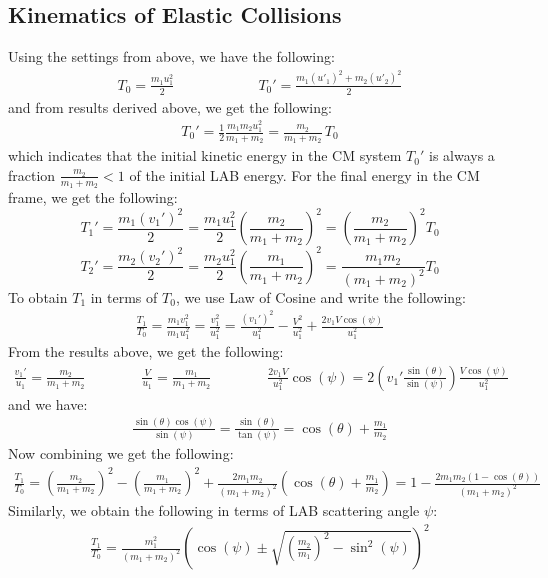 \documentclass[11pt,oneside]{book}
\theoremstyle{break}
\theoremstyle{break}
\begin{document}
\subsection*{Kinematics of Elastic Collisions}
Using the settings from above, we have the following:
\begin{align*}
T_0 = \frac{m_1 u_1^2}{2} \qquad \qquad \qquad T_{0}' = \frac{m_1 (u'_1)^2 + m_2 (u'_2)^2}{2}
\end{align*}
and from results derived above, we get the following:
\begin{align*}
T_0' = \frac{1}{2}\frac{m_1m_2u_1^2}{m_1 + m_2}  = \frac{m_2 }{m_1 + m_2} \, T_0
\end{align*}
which indicates that the initial kinetic energy in the CM system $T_0'$ is always a fraction $\frac{m_2}{m_1+m_2}<1$ of the initial LAB energy. For the final energy in the CM frame, we get the following:
$$
T_1' = \frac{m_1(v_1')^2}{2} = \frac{m_1u_1^2}{2}\left( \frac{m_2}{m_1+m_2}\right)^2  = \left( \frac{m_2}{m_1+m_2}\right)^2 T_0 
$$
$$
T_2' = \frac{m_2(v_2')^2}{2} = \frac{m_2u_1^2}{2}\left( \frac{m_1}{m_1 + m_2}\right)^2 = \frac{m_1m_2}{(m_1 + m_2)^2}T_0
$$
To obtain $T_1$ in terms of $T_0$, we use Law of Cosine and write the following:
\begin{align*}
\frac{T_1}{T_0} = \frac{m_1 v_1^2}{m_1 u_1^2} = \frac{v_1^2}{u_1^2} = \frac{(v_1')^2}{u_1^2}- \frac{V^2}{u_1^2} + \frac{2v_1V\cos(\psi)}{u_1^2}
\end{align*}
From the results above, we get the following:
\begin{align*}
\frac{v_1'}{u_1} = \frac{m_2}{m_1 + m_2} \qquad\qquad \frac{V}{u_1} = \frac{m_1}{m_1 + m_2} \qquad\qquad \frac{2v_1 V}{u_1^2}\cos(\psi) = 2\left( v_1' \frac{\sin(\theta)}{\sin(\psi)}\right) \frac{V \cos(\psi)}{u_1^2}
\end{align*} 
and we have:
\begin{align*}
\frac{\sin(\theta)\cos(\psi)}{\sin(\psi)} = \frac{\sin(\theta)}{\tan(\psi)} = \cos(\theta) + \frac{m_1}{m_2}
\end{align*}
Now combining we get the following:
\begin{align*}
\frac{T_1}{T_0} = \left(\frac{m_2}{m_1 + m_2} \right)^2 - \left( \frac{m_1}{m_1+m_2}\right)^2 + \frac{2m_1m_2}{(m_1+m_2)^2}\left( \cos(\theta) + \frac{m_1}{m_2}\right) = 1-\frac{2m_1m_2(1-\cos(\theta))}{(m_1+m_2)^2}
\end{align*}
Similarly, we obtain the following in terms of LAB scattering angle $\psi$:
\begin{align*}
\frac{T_1}{T_0} = \frac{m_1^2}{(m_1+m_2)^2} \left( \cos(\psi) \pm \sqrt{\left(\frac{m_2}{m_1}\right)^2 - \sin^2(\psi)}\right)^2 \tag{*}
\end{align*}
\end{document}

